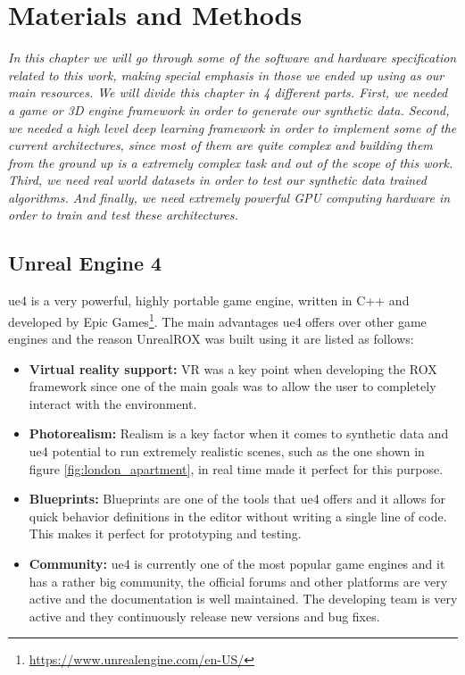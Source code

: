 
\chapter{Materials and Methods}
\label{metodologia}
\textit{In this chapter we will go through some of the software and hardware specification related to this work, making special emphasis in those we ended up using as our main resources. We will divide this chapter in 4 different parts. First, we needed a game or 3D engine framework in order to generate our synthetic data. Second, we needed a high level deep learning framework in order to implement some of the current architectures, since most of them are quite complex and building them from the ground up is a extremely complex task and out of the scope of this work. Third, we need real world datasets in order to test our synthetic data trained algorithms. And finally, we need extremely powerful GPU computing hardware in order to train and test these architectures.}

\section{Unreal Engine 4}
\gls{ue4} is a very powerful, highly portable game engine, written in C++ and developed by Epic Games\footnote{\url{https://www.unrealengine.com/en-US/}}.
The main advantages \gls{ue4} offers over other game engines and the reason UnrealROX was built using it are listed as follows:

\begin{itemize}
	\item \textbf{Virtual reality support:} VR was a key point when developing the ROX framework since one of the main goals was to allow the user to completely interact with the environment.
	\item \textbf{Photorealism:} Realism is a key factor when it comes to synthetic data and \gls{ue4} potential to run extremely realistic scenes, such as the one shown in figure \ref{fig:london_apartment}, in real time made it perfect for this purpose.
	\item \textbf{Blueprints:} Blueprints are one of the tools that \gls{ue4} offers and it allows for quick behavior definitions in the editor without writing a single line of code. This makes it perfect for prototyping and testing.
	\item \textbf{Community:} \gls{ue4} is currently one of the most popular game engines and it has a rather big community, the official forums and other platforms are very active and the documentation is well maintained. The developing team is very active and they continuously release new versions and bug fixes. 
\end{itemize}

